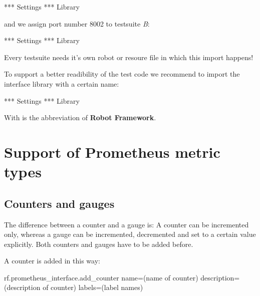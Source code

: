 \begin{robotcode}
*** Settings ***
Library    %
\end{robotcode}

and we assign port number 8002 to testsuite \textit{B}:

\begin{robotcode}
*** Settings ***
Library    %
\end{robotcode}

Every testsuite needs it's own robot or resoure file in which this import happens!

To support a better readibility of the test code we recommend to import the interface library with a certain name:

\begin{robotcode}
*** Settings ***
Library    %
\end{robotcode}

With  is the abbreviation of \textbf{Robot Framework}.


\newpage

\section{Support of Prometheus metric types}

\subsection{Counters and gauges}

The difference between a counter and a gauge is: A counter can be incremented only, whereas a gauge can be incremented, decremented and set to a certain value explicitly.
Both counters and gauges have to be added before.

A counter is added in this way:

\begin{robotcode}
rf.prometheus_interface.add_counter    name=(name of counter)     description=(description of counter)     labels=(label names)
\end{robotcode}

